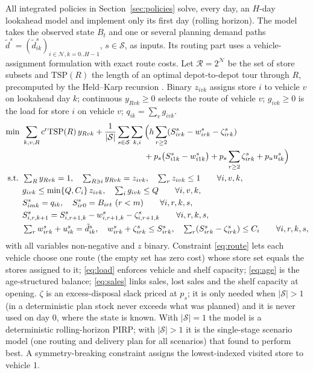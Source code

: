 All integrated policies in Section~\ref{sec:policies} solve, every day, an $H$-day lookahead model and implement only its first day (rolling horizon). The model takes the observed state $B_t$ and one or several planning demand paths $\tilde d^{s}=(\tilde d^{s}_{ik})_{i\in\mathcal N,k=0..H-1}$, $s\in\mathcal S$, as inputs. Its routing part uses a vehicle-assignment formulation with exact route costs. Let $\mathcal R=2^{\mathcal N}$ be the set of store subsets and $\mathrm{TSP}(R)$ the length of an optimal depot-to-depot tour through $R$, precomputed by the Held--Karp recursion \citep{held1962dynamic}. Binary $z_{ivk}$ assigns store $i$ to vehicle $v$ on lookahead day $k$; continuous $y_{Rvk}\ge 0$ selects the route of vehicle $v$; $g_{ivk}\ge 0$ is the load for store $i$ on vehicle $v$; $q_{ik}=\sum_v g_{ivk}$.
\begin{align}
  \min\ & \sum_{k,v,R} c^{\mathrm{r}}\mathrm{TSP}(R)\,y_{Rvk} + \frac{1}{|\mathcal S|}\sum_{s\in\mathcal S}\sum_{k,i}\Big(h\sum_{r\ge 2}(S^{s}_{irk}-w^{s}_{irk}-\zeta^{s}_{irk}) \notag\\
  & \hspace{5.2cm} + p_s\big(S^{s}_{i1k}-w^{s}_{i1k}\big) + p_s\sum_{r\ge2}\zeta^{s}_{irk} + p_u u^{s}_{ik}\Big) \label{eq:obj}\\
  \text{s.t. }& \textstyle\sum_{R} y_{Rvk}=1,\quad \sum_{R\ni i}y_{Rvk}=z_{ivk},\quad \sum_v z_{ivk}\le 1 \qquad \forall i,v,k, \label{eq:route}\\
  & g_{ivk}\le \min\{Q,C_i\}\,z_{ivk},\quad \textstyle\sum_i g_{ivk}\le Q \qquad \forall i,v,k,\label{eq:load}\\
  & S^{s}_{imk}=q_{ik},\quad S^{s}_{ir0}=B_{irt}\ (r<m) \qquad \forall i,r,k,s, \notag\\
  & S^{s}_{i,r,k+1}=S^{s}_{i,r+1,k}-w^{s}_{i,r+1,k}-\zeta^{s}_{i,r+1,k} \qquad \forall i,r,k,s,\label{eq:age}\\
  & \textstyle\sum_r w^{s}_{irk}+u^{s}_{ik}=\tilde d^{s}_{ik},\quad w^{s}_{irk}+\zeta^{s}_{irk}\le S^{s}_{irk},\quad \sum_r (S^{s}_{irk}-\zeta^{s}_{irk})\le C_i \qquad \forall i,r,k,s,\label{eq:sales}
\end{align}
with all variables non-negative and $z$ binary. Constraint \eqref{eq:route} lets each vehicle choose one route (the empty set has zero cost) whose store set equals the stores assigned to it; \eqref{eq:load} enforces vehicle and shelf capacity; \eqref{eq:age} is the age-structured balance; \eqref{eq:sales} links sales, lost sales and the shelf capacity at opening. $\zeta$ is an excess-disposal slack priced at $p_s$; it is only needed when $|\mathcal S|>1$ (in a deterministic plan stock never exceeds what was planned) and it is never used on day $0$, where the state is known. With $|\mathcal S|=1$ the model is a deterministic rolling-horizon PIRP; with $|\mathcal S|>1$ it is the single-stage scenario model (one routing and delivery plan for all scenarios) that \citet{jia2025scenario} found to perform best. A symmetry-breaking constraint assigns the lowest-indexed visited store to vehicle 1.

